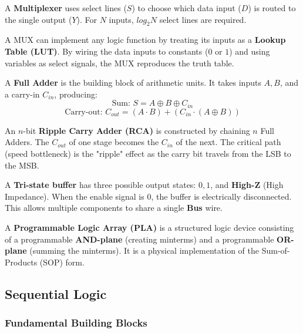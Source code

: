 \begin{definition}
	A \textbf{Multiplexer} uses select lines ($S$) to choose which data input ($D$) is routed to the single output ($Y$). For $N$ inputs, $log_2 N$ select lines are required.
\end{definition}

\begin{example}
	A MUX can implement any logic function by treating its inputs as a \textbf{Lookup Table (LUT)}. By wiring the data inputs to constants ($0$ or $1$) and using variables as select signals, the MUX reproduces the truth table.
\end{example}

\begin{definition}
	A \textbf{Full Adder} is the building block of arithmetic units. It takes inputs $A, B$, and a carry-in $C_{in}$, producing:
	$$\text{Sum: } S = A \oplus B \oplus C_{in}$$
	$$\text{Carry-out: } C_{out} = (A \cdot B) + (C_{in} \cdot (A \oplus B))$$
\end{definition}

\begin{important}
	An $n$-bit \textbf{Ripple Carry Adder (RCA)} is constructed by chaining $n$ Full Adders. The $C_{out}$ of one stage becomes the $C_{in}$ of the next. The critical path (speed bottleneck) is the "ripple" effect as the carry bit travels from the LSB to the MSB.
\end{important}

\begin{lemma}
	A \textbf{Tri-state buffer} has three possible output states: $0, 1$, and \textbf{High-Z} (High Impedance). When the enable signal is $0$, the buffer is electrically disconnected. This allows multiple components to share a single \textbf{Bus} wire.
\end{lemma}

\begin{example}
	A \textbf{Programmable Logic Array (PLA)} is a structured logic device consisting of a programmable \textbf{AND-plane} (creating minterms) and a programmable \textbf{OR-plane} (summing the minterms). It is a physical implementation of the Sum-of-Products (SOP) form.
\end{example}

\subsection{Sequential Logic}

\subsubsection{Fundamental Building Blocks}

